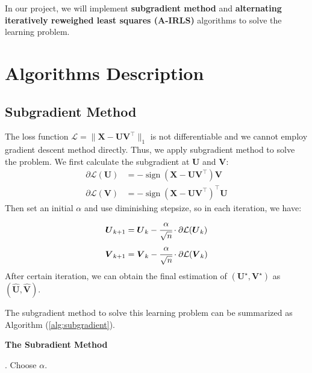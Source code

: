 \documentclass[conference]{IEEEtran}
\begin{document}
In our project, we will implement \textbf{subgradient method} and \textbf{alternating iteratively reweighed least squares (A-IRLS)} algorithms to solve the learning problem.


\section{Algorithms Description}
\subsection{Subgradient Method}
The loss function $\mathcal{L}=\|\boldsymbol{X}-\boldsymbol{U} \boldsymbol{V}^{\top}\|_{1}$ is not differentiable and we cannot employ gradient descent method directly. Thus, we apply subgradient method to solve the problem. We first calculate the subgradient at $\boldsymbol{U}$ and $\boldsymbol{V}$:
\begin{equation}
    \label{eq2}
	\begin{split}
		\partial \mathcal{L}(\boldsymbol{U})&=-\operatorname{sign}(\boldsymbol{X}-\boldsymbol{U} \boldsymbol{V}^{\top})\boldsymbol{V}\\
		\partial \mathcal{L}(\boldsymbol{V})&=-\operatorname{sign}(\boldsymbol{X}-\boldsymbol{U} \boldsymbol{V}^{\top})^{\top}\boldsymbol{U} 
	\end{split}
\end{equation}
Then set an initial $\alpha$ and use diminishing stepsize, so in each iteration, we have:
\begin{equation}
	\begin{split}
		\boldsymbol{U}_{k+1}&=\boldsymbol{U}_{k}-\cfrac{\alpha}{\sqrt n}\cdot\partial\mathcal{L}(\boldsymbol{U}_{k})\\
		\boldsymbol{V}_{k+1}&=\boldsymbol{V}_{k}-\cfrac{\alpha}{\sqrt n}\cdot\partial\mathcal{L}(\boldsymbol{V}_{k})
	\end{split}
    \label{eq4}
\end{equation}
After certain iteration, we can obtain the final estimation of $\left(\boldsymbol{U}^{\star},\boldsymbol{V}^{\star}\right)$ as $\left(\widehat{\boldsymbol{U}},\widehat{\boldsymbol{V}}\right)$.

The subgradient method to solve this learning problem can be summarized as Algorithm (\ref{alg:subgradient}).
\begin{algorithm2e}[h]
\caption{\textbf{The Subradient Method}}    
\label{alg:subgradient}
. Choose $\alpha$. \\ 
\end{algorithm2e}
	
\end{document}
